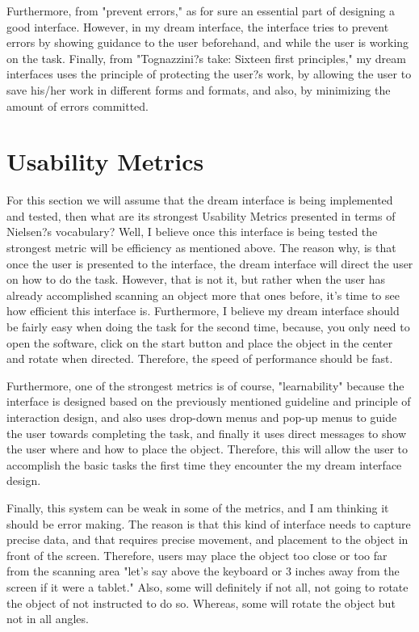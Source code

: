 \documentclass[12pt, oneside]{amsart}   	%
\begin{document}
Furthermore, from "prevent errors," as for sure an essential part of designing a good interface.  However, in my dream interface, the interface tries to prevent errors by showing guidance to the user beforehand, and while the user is working on the task.  Finally, from "Tognazzini?s take: Sixteen first principles," my dream interfaces uses the principle of protecting the user?s work, by allowing the user to save his/her work in different forms and formats, and also, by minimizing the amount of errors committed.

\section{Usability Metrics}

For this section we will assume that the dream interface is being implemented and tested, then what are its strongest Usability Metrics presented in terms of Nielsen?s vocabulary?  Well, I believe once this interface is being tested the strongest metric will be efficiency as mentioned above.  The reason why, is that once the user is presented to the interface, the dream interface will direct the user on how to do the task.  However, that is not it, but rather when the user has already accomplished scanning an object more that ones before, it's time to see how efficient this interface is.  Furthermore, I believe my dream interface should be fairly easy when doing the task for the second time, because, you only need to open the software, click on the start button and place the object in the center and rotate when directed.  Therefore, the speed of performance should be fast.

Furthermore, one of the strongest metrics is of course, "learnability" because the interface is designed based on the previously mentioned guideline and principle of interaction design, and also uses drop-down menus and pop-up menus to guide the user towards completing the task, and finally it uses direct messages to show the user where and how to place the object.  Therefore,  this will allow the user to accomplish the basic tasks the first time they encounter the my dream interface design.

Finally, this system can be weak in some of the metrics, and I am thinking it should be error making.  The reason is that this kind of interface needs to capture precise data, and that requires precise movement, and placement to the object in front of the screen.  Therefore, users may place the object too close or too far from the scanning area "let's say above the keyboard or 3 inches away from the screen if it were a tablet."  Also, some will definitely if not all, not going to rotate the object of not instructed to do so. Whereas, some will rotate the object but not in all angles.  
\end{document}
